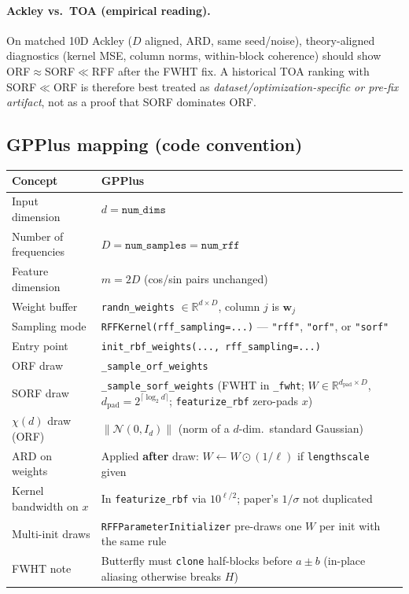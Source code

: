 \documentclass[11pt]{article}
\begin{document}
\paragraph{Ackley vs.\ TOA (empirical reading).}
On matched 10D Ackley ($D$ aligned, ARD, same seed/noise), theory-aligned diagnostics (kernel MSE, column norms, within-block coherence)
should show ORF$\approx$SORF$\ll$RFF after the FWHT fix.
A historical TOA ranking with SORF$\ll$ORF is therefore best treated as \emph{dataset/optimization-specific or pre-fix artifact}, not as a proof that SORF dominates ORF.

\subsection{GPPlus mapping (code convention)}

\begin{center}
\renewcommand{\arraystretch}{1.25}
\begin{tabular}{@{}ll@{}}
\toprule
\textbf{Concept} & \textbf{GPPlus} \\
\midrule
Input dimension & $d = \texttt{num\_dims}$ \\
Number of frequencies & $D = \texttt{num\_samples} = \texttt{num\_rff}$ \\
Feature dimension & $m = 2D$ (cos/sin pairs unchanged) \\
Weight buffer & \texttt{randn\_weights} $\in \mathbb{R}^{d\times D}$, column $j$ is $\mathbf w_j$ \\
Sampling mode & \texttt{RFFKernel(rff\_sampling=...)} --- \texttt{"rff"}, \texttt{"orf"}, or \texttt{"sorf"} \\
Entry point & \texttt{init\_rbf\_weights(..., rff\_sampling=...)} \\
ORF draw & \texttt{\_sample\_orf\_weights} \\
SORF draw & \texttt{\_sample\_sorf\_weights} (FWHT in \texttt{\_fwht}; $W\in\mathbb{R}^{d_{\mathrm{pad}}\times D}$, $d_{\mathrm{pad}}=2^{\lceil\log_2 d\rceil}$; \texttt{featurize\_rbf} zero-pads $x$) \\
$\chi(d)$ draw (ORF) & $\|\mathcal N(0,I_d)\|$ (norm of a $d$-dim.\ standard Gaussian) \\
ARD on weights & Applied \textbf{after} draw: $W \leftarrow W \odot (1/\boldsymbol{\ell})$ if \texttt{lengthscale} given \\
Kernel bandwidth on $x$ & In \texttt{featurize\_rbf} via $10^{\ell/2}$; paper's $1/\sigma$ not duplicated \\
Multi-init draws & \texttt{RFFParameterInitializer} pre-draws one $W$ per init with the same rule \\
FWHT note & Butterfly must \texttt{clone} half-blocks before $a\pm b$ (in-place aliasing otherwise breaks $H$) \\
\bottomrule
\end{tabular}
\end{center}
\end{document}

